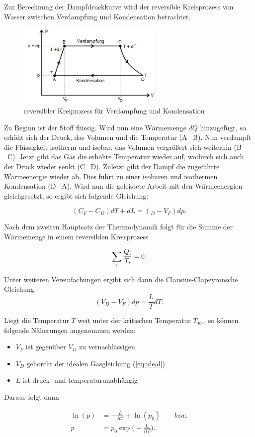 Zur Berechnung der Dampfdruckkurve wird der reversible Kreisprozess von Wasser
zwischen Verdampfung und Kondensation betrachtet.

\begin{figure}
  \centering
  \includegraphics[height=4cm]{Kreisprozess.jpeg}
  \caption{reversibler Kreiprozess für Verdampfung und Kondensation}
  \label{fig:kreis}
\end{figure}

Zu Beginn ist der Stoff flüssig. Wird nun eine Wärmemenge $dQ$ hinzugefügt,
so erhöht sich der Druck, das Volumen und die Temperatur (A \rightarrow \ B).
Nun verdampft die Flüssigkeit isotherm und isobar, das Volumen
vergrößert sich weiterhin (B \rightarrow \ C). Jetzt gibt das Gas die erhöhte
Temperatur wieder auf, wodurch sich auch der Druck wieder senkt (C \rightarrow \ D).
Zuletzt gibt der Dampf die zugeführte Wärmeenergie wieder ab. Dies führt zu einer
isobaren und isothermen Kondensation (D \rightarrow \ A).
Wird nun die geleistete Arbeit mit den Wärmeenergien gleichgesetzt, so ergibt sich
folgende Gleichung:

\begin{equation}
  (C_F - C_D)dT + dL = (_D - V_F)dp .
\end{equation}

Nach dem zweiten Hauptsatz der Thermodynamik folgt für die Summe der Wärmemenge
in einem reversiblen Kreisprozess

\begin{equation}
  \sum_i{\frac{Q_i}{T_i}} = 0 . \notag
\end{equation}

Unter weiteren Vereinfachungen ergibt sich dann die Clausius-Clapeyronsche
Gleichung
\begin{equation}
  (V_D - V_F)dp = \frac{L}{T}dT \label{eq:clausius}.
\end{equation}

Liegt die Temperatur $T$ weit unter der kritischen Temperatur $T_{Kr}$, so können
folgende Näherungen angenommen werden:
\begin{itemize}
  \item $V_F$ ist gegenüber $V_D$ zu vernachlässigen \\
  \item $V_D$ gehorcht der idealen Gasgleichung (\ref{eq:ideal}) \\
  \item $L$ ist druck- und temperaturunabhängig \\
\end{itemize}

Daraus folgt dann

\begin{align}
  \ln{(p)} &= -\frac{L}{RT} + \ln{(p_0)}  \qquad bzw. \label{eq:3}  \\
  p &= p_0 \exp{\biggr(-\frac{L}{RT} \biggl)} . \label{eq:4}
\end{align} \cite{TU}
